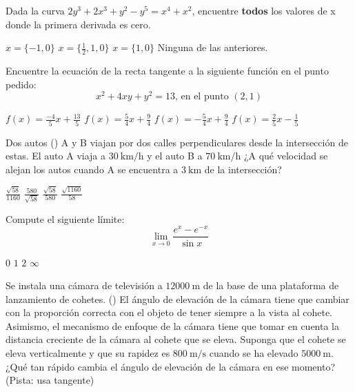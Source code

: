 \pregunta[5]
Dada la curva $2y^3+2x^3+y^2-y^5=x^4+x^2$, encuentre \textbf{todos} los valores de x donde la primera derivada es cero.
\mostrarpuntaje

\begin{alternativas}
   \alternativa  $x = \{-1, 0\}$
   \alternativaCorrecta$x = \{\frac{1}{2}, 1,0\}$
   \alternativa $x = \{1, 0\}$
   \alternativa Ninguna de las anteriores.
\end{alternativas}
%
\pregunta[5]
Encuentre la ecuación de la recta tangente a la siguiente función en el punto pedido:
$$x^2 + 4xy + y^2 = 13 \text{, en el punto }(2,1)$$
\mostrarpuntaje
\begin{alternativas}
   \alternativaCorrecta $f(x) = \frac{-4}{5}x + \frac{13}{5}$
   \alternativa $f(x) = \frac{5}{4}x + \frac{9}{4}$
   \alternativa $f(x) = -\frac{5}{4}x + \frac{9}{4}$
   \alternativa $f(x) = \frac{2}{5}x - \frac{1}{5}$
\end{alternativas}
%
\pregunta[5]
Dos autos ({\emoji {}}) A y B viajan por dos calles perpendiculares desde la intersección de  estas. El auto A viaja a $\SI{30}{\kilo\meter\per\hour}$ y el auto B a $\SI{70}{\kilo\meter\per\hour}$ ¿A qué velocidad se alejan los autos cuando A se encuentra a $\SI{3}{\kilo\meter}$ de la intersección?
\mostrarpuntaje

\begin{alternativas}
   \alternativa  $\frac{\sqrt{58}}{1160}$
   \alternativaCorrecta$\frac{580}{\sqrt{58}}$
   \alternativa $\frac{\sqrt{58}}{580}$
   \alternativa $\frac{\sqrt{1160}}{58}$
\end{alternativas}
%
\pregunta[5]
Compute el siguiente límite:
$$\lim_{x\to0} \frac{e^x - e^{-x}}{\sin{x}}$$
\mostrarpuntaje

\begin{alternativas}
   \alternativa $0$
   \alternativa $1$
   \alternativaCorrecta$2$
   \alternativa $\infty$
\end{alternativas}
%
\pregunta[5]
Se instala una cámara de televisión a $\SI{12000}{\meter}$ de la base de una plataforma de lanzamiento de cohetes. ({\emoji {}}) El  ángulo de elevación de la cámara tiene que cambiar con la proporción correcta con el objeto de tener siempre a la vista al cohete. Asimismo, el mecanismo de enfoque de la cámara tiene que tomar en cuenta la distancia creciente de la cámara al cohete que se eleva. Suponga que el cohete se eleva verticalmente y que su rapidez es $\SI{800}{\meter\per\second}$ cuando se ha elevado $\SI{5000}{\meter}$. ¿Qué tan rápido cambia el ángulo de elevación de la cámara en ese momento? (Pista: usa tangente)
\mostrarpuntaje

